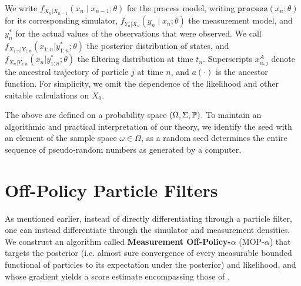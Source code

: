 \documentclass[9pt,twocolumn,twoside]{pnas-new}
\begin{document}
We write $f_{X_n|X_{n-1}}\left(x_{n} \mid x_{n-1}; \theta\right)$ for the process model, writing $\texttt{process}\left(x_n; \theta\right)$ for its corresponding simulator, $f_{Y_n|X_n}\left(y_n \mid x_n; \theta\right)$ the measurement model, and $y_n^*$ for the actual values of the observations that were observed. We call $f_{X_{1:n}|Y_{1:n}}(x_{1:n}|y_{1:n}^*; \theta)$ the posterior distribution of states, and $f_{X_{n}|Y_{1:n}}(x_n|y_{1:n}^*; \theta)$ the filtering distribution at time $t_n$. Superscripts $x_{n,j}^A$ denote the ancestral trajectory of particle $j$ at time $n$, and $a(\cdot)$ is the ancestor function. For simplicity, we omit the dependence of the likelihood and other suitable calculations on $X_0.$ 

The above are defined on a probability space $(\Omega, \Sigma, \mathbb{P}).$ 
To maintain an algorithmic and practical interpretation of our theory, we identify the seed with an element of the sample space $\omega \in \Omega$, as a random seed determines the entire sequence of pseudo-random numbers as generated by a computer. 



\section{Off-Policy Particle Filters}

As mentioned earlier, instead of directly differentiating through a particle filter, one can instead differentiate through the simulator and measurement densities. We construct an algorithm called \textbf{Measurement Off-Policy-$\alpha$} (MOP-$\alpha$) that targets the posterior (i.e. almost sure convergence of every measurable bounded functional of particles to its expectation under the posterior) and likelihood, and whose gradient yields a score estimate encompassing those of \cite{poyiadjis11, scibior21, blei2018vsmc}.
\end{document}
